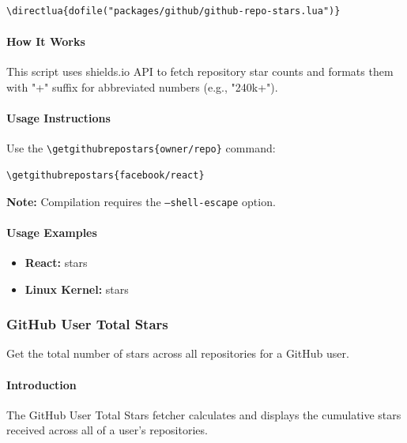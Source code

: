 \documentclass{article}
\begin{document}
\begin{verbatim}
\directlua{dofile("packages/github/github-repo-stars.lua")}
\end{verbatim}

\paragraph{How It Works}

This script uses shields.io API to fetch repository star counts and formats them with "+" suffix for abbreviated numbers (e.g., "240k+").

\paragraph{Usage Instructions}

Use the \verb|\getgithubrepostars{owner/repo}| command:

\begin{verbatim}
\getgithubrepostars{facebook/react}
\end{verbatim}

\textbf{Note:} Compilation requires the \texttt{--shell-escape} option.

\paragraph{Usage Examples}

\begin{itemize}
    \item \textbf{React:}  stars
    \item \textbf{Linux Kernel:}  stars
\end{itemize}

\subsubsection{GitHub User Total Stars}

Get the total number of stars across all repositories for a GitHub user.

\paragraph{Introduction}

The GitHub User Total Stars fetcher calculates and displays the cumulative stars received across all of a user's repositories.
\end{document}
